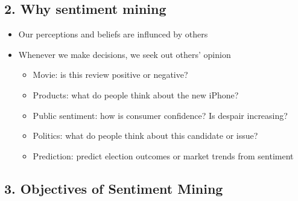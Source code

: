 \documentclass[11pt]{article}
\providecommand{\tightlist}{%
      \setlength{\itemsep}{0pt}\setlength{\parskip}{0pt}}
\begin{document}
    \hypertarget{why-sentiment-mining}{%
\subsection{2. Why sentiment mining}\label{why-sentiment-mining}}

\begin{itemize}
\tightlist
\item
  Our perceptions and beliefs are influnced by others
\item
  Whenever we make decisions, we seek out others' opinion

  \begin{itemize}
  \tightlist
  \item
    Movie: is this review positive or negative?
  \item
    Products: what do people think about the new iPhone?
  \item
    Public sentiment: how is consumer confidence? Is despair increasing?
  \item
    Politics: what do people think about this candidate or issue?
  \item
    Prediction: predict election outcomes or market trends from
    sentiment
  \end{itemize}
\end{itemize}

    \hypertarget{objectives-of-sentiment-mining}{%
\subsection{3. Objectives of Sentiment
Mining}\label{objectives-of-sentiment-mining}}
\end{document}
